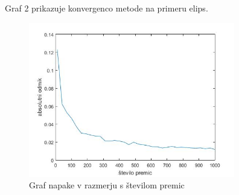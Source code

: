 \documentclass[a4paper]{article}
\begin{document}
Graf 2 prikazuje konvergenco metode na primeru elips.

\begin{figure}[h]
\centering
\includegraphics[width=90mm]{graf_elipsa2.jpg}
\caption{Graf napake v razmerju s številom premic \label{overflow}}
\end{figure} 
\end{document}
